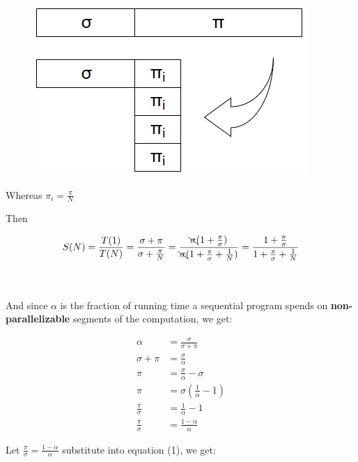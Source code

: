 \documentclass[a4paper]{article}
\begin{document}
\begin{figure}[h]
\label{fig:ap1}
\includegraphics[scale=0.6]{serial_parallel_parts.png}
\centering
\end{figure}

\noindent
Whereas {\Large $\pi_{i} = \frac{\pi}{N}$}

\pagebreak

\noindent
Then
\begin{large}
\begin{equation}
S(N) = \frac{T(1)}{T(N)} = \frac{\sigma + \pi}{\sigma + \frac{\pi}{N}} =  \frac{\bcancel{\sigma} (1 + \frac{\pi}{\sigma})}{\bcancel{\sigma} (1 + \frac{\pi}{\sigma} + \frac{1}{N} )} = \frac{1 + \frac{\pi}{\sigma}}{1 + \frac{\pi}{\sigma} + \frac{1}{N}}
\end{equation}
\end{large}
\\
\\
\noindent
And since $\alpha$ is the fraction of running time a sequential program spends on \textbf{non-parallelizable} segments of the computation, we get:

\begin{large}
\begin{align*}
\alpha &= \frac{\sigma}{\sigma + \pi} \\
\sigma + \pi &= \frac{\sigma}{\alpha} \\
\pi &= \frac{\sigma}{\alpha} - \sigma \\
\pi &= \sigma (\frac{1}{\alpha} - 1) \\
\frac{\pi}{\sigma} &= \frac{1}{\alpha} - 1 \\
\frac{\pi}{\sigma} &= \frac{1 - \alpha}{\alpha}
\end{align*}
\end{large}

Let {\large $\frac{\pi}{\sigma} = \frac{1 - \alpha}{\alpha}$} substitute into equation (1), we get:
\end{document}
